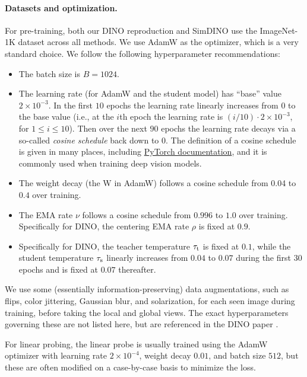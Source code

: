 \documentclass[../../book-main.tex]{subfiles}
\begin{document}
\paragraph{Datasets and optimization.} For pre-training, both our DINO reproduction and SimDINO use the ImageNet-1K dataset across all methods. We use AdamW \citep{Loshchilov2017DecoupledWD} as the optimizer, which is a very standard choice. We follow the following hyperparameter recommendations:
\begin{itemize}
    \item The batch size is \(B = 1024\).
    \item The learning rate (for AdamW and the student model) has ``base'' value \(2 \times 10^{-3}\). In the first \(10\) epochs the learning rate linearly increases from \(0\) to the base value (i.e., at the \(i\)th epoch the learning rate is \((i/10) \cdot 2 \times 10^{-3}\), for \(1 \leq i \leq 10\)). Then over the next \(90\) epochs the learning rate decays via a so-called \textit{cosine schedule} back down to \(0\). The definition of a cosine schedule is given in many places, including \href{https://pytorch.org/docs/stable/generated/torch.optim.lr_scheduler.CosineAnnealingLR.html}{PyTorch documentation}, and it is commonly used when training deep vision models.
    \item The weight decay (the W in AdamW) follows a cosine schedule from 0.04 to \(0.4\) over training.
    \item The EMA rate \(\nu\) follows a cosine schedule from \(0.996\) to \(1.0\) over training. Specifically for DINO, the centering EMA rate \(\rho\) is fixed at \(0.9\).
    \item Specifically for DINO, the teacher temperature \(\tau_{\mathrm{t}}\) is fixed at \(0.1\), while the student temperature \(\tau_{\mathrm{s}}\) linearly increases from \(0.04\) to \(0.07\) during the first \(30\) epochs and is fixed at \(0.07\) thereafter.
\end{itemize}
We use some (essentially information-preserving) data augmentations, such as flips, color jittering, Gaussian blur, and solarization, for each seen image during training, before taking the local and global views. The exact hyperparameters governing these are not listed here, but are referenced in the DINO paper \citep{caron2021emerging}.

For linear probing, the linear probe is usually trained using the AdamW optimizer with learning rate \(2 \times 10^{-4}\), weight decay \(0.01\), and batch size \(512\), but these are often modified on a case-by-case basis to minimize the loss.
\end{document}
